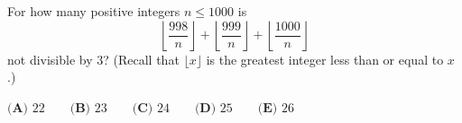 For how many positive integers $n\le1000$ is
\[\left\lfloor\dfrac{998}{n}\right\rfloor+\left\lfloor\dfrac{999}{n}\right\rfloor+\left\lfloor\dfrac{1000}{n}\right\rfloor\]
not divisible by $3$? (Recall that $\lfloor x\rfloor$ is the greatest integer less than or equal to $x$.)

$\textbf{(A) }22\qquad\textbf{(B) }23\qquad\textbf{(C) }24\qquad\textbf{(D) }25\qquad\textbf{(E) }26$
